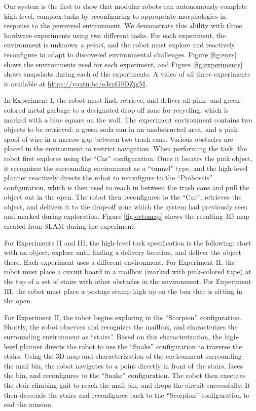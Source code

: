 \documentclass[12pt]{article}
\begin{document}
Our system is the first to show that modular robots can autonomously complete high-level, complex tasks by reconfiguring to appropriate morphologies in response to the perceived environment. We demonstrate this ability with three hardware experiments using two different tasks. For each experiment, the environment is unknown \textit{a priori}, and the robot must explore and reactively reconfigure to adapt to discovered environmental challenges. Figure \ref{fig:envs} shows the environments used for each experiment, and Figure \ref{fig:experiments} shows snapshots during each of the experiments. A video of all three experiments is available at \url{https://youtu.be/eJsnG9DZjgM}.

In Experiment I, the robot must find, retrieve, and deliver all pink- and green-colored metal garbage to a designated drop-off zone for recycling, which is marked with a blue square on the wall. The experiment environment contains two objects to be retrieved: a green soda can in an unobstructed area, and a pink spool of wire in a narrow gap between two trash cans. Various obstacles are placed in the environment to restrict navigation. When performing the task, the robot first explores using the ``Car'' configuration. Once it locates the pink object, it recognizes the surrounding environment as a ``tunnel'' type, and the high-level planner reactively directs the robot to reconfigure to the ``Proboscis'' configuration, which is then used to reach in between the trash cans and pull the object out in the open. The robot then reconfigures to the ``Car'', retrieves the object, and delivers it to the drop-off zone which the system had previously seen and marked during exploration. Figure \ref{fig:octomap} shows the resulting 3D map created from SLAM during the experiment.

For Experiments II and III, the high-level task specification is the following: start with an object, explore until finding a delivery location, and deliver the object there. Each experiment uses a different environment. For Experiment II, the robot must place a circuit board in a mailbox (marked with pink-colored tape) at the top of a set of stairs with other obstacles in the environment. For Experiment III, the robot must place a postage stamp high up on the box that is sitting in the open.

For Experiment II, the robot begins exploring in the ``Scorpion'' configuration. Shortly, the robot observes and recognizes the mailbox, and characterizes the surrounding environment as ``stairs''. Based on this characterization, the high-level planner directs the robot to use the ``Snake'' configuration to traverse the stairs. Using the 3D map and characterization of the environment surrounding the mail bin, the robot navigates to a point directly in front of the stairs, faces the bin, and reconfigures to the ``Snake'' configuration. The robot then executes the stair climbing gait to reach the mail bin, and drops the circuit successfully. It then descends the stairs and reconfigures back to the ``Scorpion'' configuration to end the mission.
\end{document}
